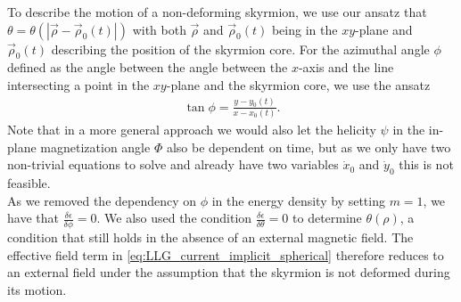 \documentclass[1p]{elsarticle}		%
\numberwithin{equation}{section}
\begin{document}
To describe the motion of a non-deforming skyrmion, we use our ansatz that $\theta = \theta(|\vec{\rho}-\vec{\rho}_0(t)|)$ with both $\vec{\rho}$ and $\vec{\rho}_0(t)$ being in the $xy$-plane and $\vec{\rho}_0(t)$ describing the position of the skyrmion core. For the azimuthal angle $\phi$ defined as the angle between the angle between the $x$-axis and the line intersecting a point in the $xy$-plane and the skyrmion core, we use the ansatz
\begin{align}
\tan\phi = \frac{y-y_0(t)}{x-x_0(t)}.
\end{align}
Note that in a more general approach we would also let the helicity $\psi$ in the in-plane magnetization angle $\Phi$ also be dependent on time, but as we only have two non-trivial equations to solve and already have two variables $\dot{x}_0$ and $\dot{y}_0$ this is not feasible. \\
As we removed the dependency on $\phi$ in the energy density by setting $m=1$, we have that $\frac{\delta \epsilon}{\delta \phi} = 0$. We also used the condition $\frac{\delta\epsilon}{\delta\theta}=0$ to determine $\theta(\rho)$, a condition that still holds in the absence of an external magnetic field. The effective field term in \eqref{eq:LLG_current_implicit_spherical} therefore reduces to an external field under the assumption that the skyrmion is not deformed during its motion.
\end{document}
